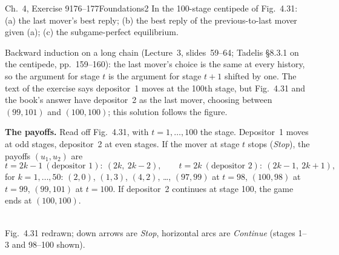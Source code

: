 \begin{exsol}{\MG{} Ch.~4, Exercise 9}{176--177}{Foundations}{2}
\asked In the 100-stage centipede of Fig.~4.31: (a) the last mover's best reply; (b) the best reply
of the previous-to-last mover given (a); (c) the subgame-perfect equilibrium.

\method Backward induction on a long chain (Lecture~3, slides~59--64; Tadelis \S8.3.1 on the
centipede, pp.~159--160): the last mover's choice is the same at every history, so the argument for
stage $t$ is the argument for stage $t+1$ shifted by one. The text of the exercise says depositor~1 moves
at the 100th stage, but Fig.~4.31 and the book's answer have depositor~2 as the last mover, choosing between
$(99,101)$ and $(100,100)$; this solution follows the figure.

\solution
\textbf{The payoffs.} Read off Fig.~4.31, with $t = 1, \dots, 100$ the stage. Depositor~1 moves at odd stages,
depositor~2 at even stages. If the mover at stage $t$ stops (\emph{Stop}), the payoffs $(u_1,u_2)$ are
\[
  t = 2k-1\ (\text{depositor 1}):\ (2k,\ 2k-2), \qquad t = 2k\ (\text{depositor 2}):\ (2k-1,\ 2k+1),
\]
for $k = 1, \dots, 50$: $(2,0)$, $(1,3)$, $(4,2)$, \dots, $(97,99)$ at $t = 98$, $(100,98)$ at $t = 99$,
$(99,101)$ at $t = 100$. If depositor~2 continues at stage 100, the game ends at $(100,100)$.
\begin{center}
\\[2pt]
{\footnotesize Fig.~4.31 redrawn; down arrows are \emph{Stop}, horizontal arcs are \emph{Continue}
(stages 1--3 and 98--100 shown).}
\end{center}


\end{exsol}
